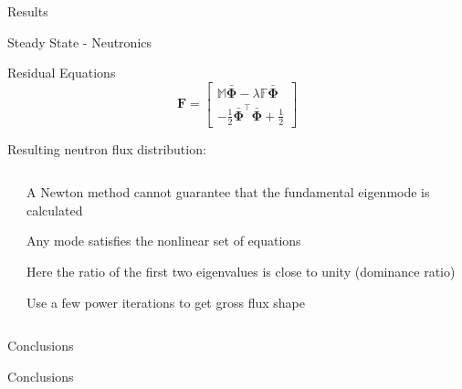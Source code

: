 \documentclass{beamer}
\begin{document}
\begin{section}{Results}
\begin{frame}{Steady State - Neutronics}
\begin{customlist}{2ex}{0pt}
  \item Residual Equations
  \[
    \mathbf{F}=\left[\begin{array}{c}
    \mathbb{M}\bar{\mathbf{\Phi}}-\lambda\mathbb{F}\bar{\mathbf{\Phi}}\\
    -\frac{1}{2}\bar{\mathbf{\Phi}}^{\top}\bar{\mathbf{\Phi}}+\frac{1}{2}
    \end{array}\right]
  \]
  \item Resulting neutron flux distribution:
\end{customlist}
  \begin{center}
  \begin{columns}
    \begin{column}{0.5\textwidth}
      \begin{animateinline}[poster = first, controls]{2}
	\scalebox{0.5}{}
	\newframe \scalebox{0.5}{}
      \end{animateinline}
    \end{column}
    \begin{column}{0.5\textwidth}
      \begin{customlist}{2ex}{0pt}
	\item A Newton method cannot guarantee that the fundamental eigenmode is calculated
	\item Any mode satisfies the nonlinear set of equations
	\item Here the ratio of the first two eigenvalues is close to unity (dominance ratio)
	\item Use a few power iterations to get gross flux shape
      \end{customlist}
    \end{column}
  \end{columns}
  \end{center}
\end{frame}
\end{section}
\begin{section}{Conclusions}
\begin{frame}{Conclusions}
\end{frame}
\end{section}
\end{document}
